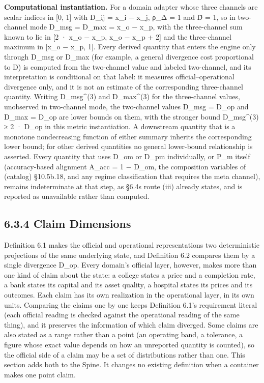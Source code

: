 \documentclass[
]{article}
\begin{document}
\textbf{Computational instantiation.} For a domain adapter whose three
channels are scalar indices in {[}0, 1{]} with D\_ij = \textbar x\_i −
x\_j\textbar, ρ\_Δ = 1 and D̄ = 1, so in two-channel mode D\_msg = D\_max
= \textbar x\_o − x\_p\textbar, with the three-channel sum known to lie
in {[}2 · \textbar x\_o − x\_p\textbar, \textbar x\_o − x\_p\textbar{} +
2{]} and the three-channel maximum in {[}\textbar x\_o − x\_p\textbar,
1{]}. Every derived quantity that enters the engine only through D\_msg
or D\_max (for example, a general divergence cost proportional to D) is
computed from the two-channel value and labeled two-channel, and its
interpretation is conditional on that label: it measures
official--operational divergence only, and it is not an estimate of the
corresponding three-channel quantity. Writing D\_msg\^{}(3) and
D\_max\^{}(3) for the three-channel values, unobserved in two-channel
mode, the two-channel values D\_msg = D\_op and D\_max = D\_op are lower
bounds on them, with the stronger bound D\_msg\^{}(3) ≥ 2 · D\_op in
this metric instantiation. A downstream quantity that is a monotone
nondecreasing function of either summary inherits the corresponding
lower bound; for other derived quantities no general lower-bound
relationship is asserted. Every quantity that uses D\_om or D\_pm
individually, or P\_m itself (accuracy-based alignment A\_acc = 1 −
D\_om, the composition variables of (catalog) §10.5b.18, and any regime
classification that requires the meta channel), remains indeterminate at
that step, as §6.4\textquotesingle s route (iii) already states, and is
reported as unavailable rather than computed.

\hypertarget{claim-dimensions}{%
\subsection{6.3.4 Claim Dimensions}\label{claim-dimensions}}

Definition 6.1 makes the official and operational representations two
deterministic projections of the same underlying state, and Definition
6.2 compares them by a single divergence D\_op. Every domain's official
layer, however, makes more than one kind of claim about the state: a
college states a price and a completion rate, a bank states its capital
and its asset quality, a hospital states its prices and its outcomes.
Each claim has its own realization in the operational layer, in its own
units. Comparing the claims one by one keeps Definition 6.1's
requirement literal (each official reading is checked against the
operational reading of the same thing), and it preserves the information
of which claim diverged. Some claims are also stated as a range rather
than a point (an operating band, a tolerance, a figure whose exact value
depends on how an unreported quantity is counted), so the official side
of a claim may be a set of distributions rather than one. This section
adds both to the Spine. It changes no existing definition when a
container makes one point claim.
\end{document}
